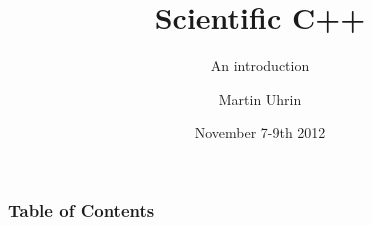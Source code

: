 \documentclass{beamer}
\title{Scientific C++}
\subtitle{An introduction}
\author{Martin Uhrin}
\institute{UCL}
\date{November 7-9th 2012}
\begin{document}
\frame{\titlepage}

\begin{frame}
\frametitle{Table of Contents}
\tableofcontents
\end{frame}






\end{document}
